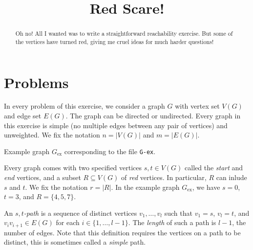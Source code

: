\documentclass{tufte-handout}
\title{Red Scare!}
\begin{document}
\maketitle
\begin{abstract}
Oh no! All I wanted was to write a straightforward reachability exercise.
But some of the vertices have turned red, giving me cruel ideas for much harder questions! 
\end{abstract}
\section{Problems}
In every problem of this exercise, we consider a graph $G$ with vertex set $V(G)$ and edge set $E(G)$.
The graph can be directed or undirected.
Every graph in this exercise is simple (no multiple edges between any pair of vertices) and unweighted.
We fix the notation $n=|V(G)|$ and $m=|E(G)|$.

\begin{marginfigure}
 \caption{Example graph $G_{\text{ex}}$ corresponding to the file {\tt G-ex}.}
\end{marginfigure}

Every graph comes with two specified vertices $s,t\in V(G)$ called the \emph{start} and \emph{end} vertices, and a subset $R\subseteq V(G)$ of \emph{red} vertices.
In particular, $R$ can inlude $s$ and $t$.
We fix the notation $r= |R|$.
In the example graph $G_{\text{ex}}$, we have $s=0$, $t=3$, and $R=\{4,5,7\}$.

An \emph{$s,t$-path} is a sequence of distinct vertices $v_1,\ldots, v_l$ such that $v_1=s$, $v_l=t$, and $v_iv_{i+1}\in E(G)$ for each $i\in\{1,\ldots,l-1\}$.
The \emph{length} of such a path is $l-1$, the number of edges.
Note that this definition requires the vertices on a path to be distinct, this is sometimes called a \emph{simple} path.
\end{document}

